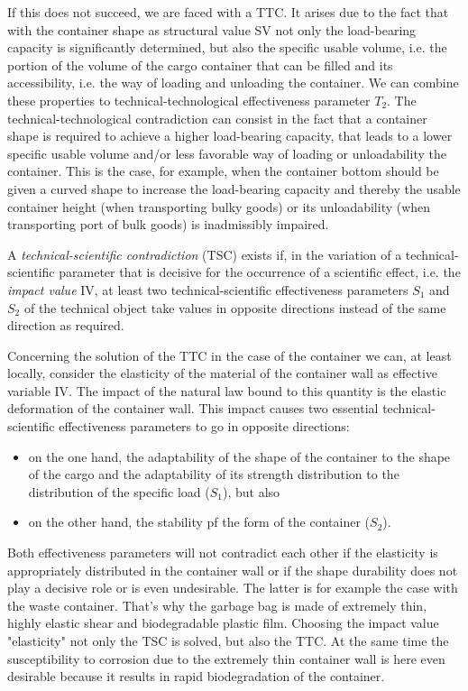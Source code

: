\documentclass[11pt,a4paper]{article}
\begin{document}
If this does not succeed, we are faced with a TTC.  It arises due to the fact
that with the container shape as structural value SV not only the load-bearing
capacity is significantly determined, but also the specific usable volume,
i.e.  the portion of the volume of the cargo container that can be filled and
its accessibility, i.e. the way of loading and unloading the container. We can
combine these properties to technical-technological effectiveness parameter
$T_2$. The technical-technological contradiction can consist in the fact that
a container shape is required to achieve a higher load-bearing capacity, that
leads to a lower specific usable volume and/or less favorable way of loading
or unloadability the container. This is the case, for example, when the
container bottom should be given a curved shape to increase the load-bearing
capacity and thereby the usable container height (when transporting bulky
goods) or its unloadability (when transporting port of bulk goods) is
inadmissibly impaired.

A \emph{technical-scientific contradiction} (TSC) exists if, in the variation
of a technical-scientific parameter that is decisive for the occurrence of a
scientific effect, i.e. the \emph{impact value} IV, at least two
technical-scientific effectiveness parameters $S_1$ and $S_2$ of the technical
object take values in opposite directions instead of the same direction as
required.

Concerning the solution of the TTC in the case of the container we can, at
least locally, consider the elasticity of the material of the container wall
as effective variable IV. The impact of the natural law bound to this quantity
is the elastic deformation of the container wall. This impact causes two
essential technical-scientific effectiveness parameters to go in opposite
directions:
\begin{itemize}
\item on the one hand, the adaptability of the shape of the container to the
  shape of the cargo and the adaptability of its strength distribution to
  the distribution of the specific load ($S_1$), but also
\item on the other hand, the stability pf the form of the container ($S_2$).
\end{itemize}

Both effectiveness parameters will not contradict each other if the elasticity
is appropriately distributed in the container wall or if the shape durability
does not play a decisive role or is even undesirable. The latter is for
example the case with the waste container. That's why the garbage bag is made
of extremely thin, highly elastic shear and biodegradable plastic film.
Choosing the impact value "elasticity" not only the TSC is solved, but also
the TTC.  At the same time the susceptibility to corrosion due to the
extremely thin container wall is here even desirable because it results in
rapid biodegradation of the container.
\end{document}
